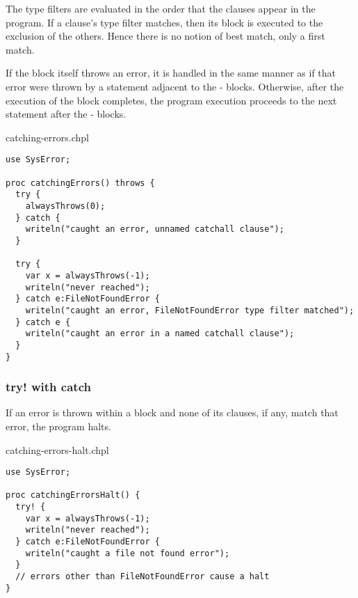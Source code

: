 The type filters are evaluated in the order that the  clauses
appear in the program. If a  clause's type filter matches,
then its block is executed to the exclusion of the others. Hence there
is no notion of best match, only a first match.

If the  block itself throws an error, it is handled in the
same manner as if that error were thrown by a statement adjacent to the
- blocks. Otherwise, after the execution of the
 block completes, the program execution proceeds to the
next statement after the - blocks.

\begin{chapelexample}{catching-errors.chpl}
\begin{chapel}
\begin{verbatim}
use SysError;

proc catchingErrors() throws {
  try {
    alwaysThrows(0);
  } catch {
    writeln("caught an error, unnamed catchall clause");
  }

  try {
    var x = alwaysThrows(-1);
    writeln("never reached");
  } catch e:FileNotFoundError {
    writeln("caught an error, FileNotFoundError type filter matched");
  } catch e {
    writeln("caught an error in a named catchall clause");
  }
}
\end{verbatim}
\end{chapel}
\end{chapelexample}

\subsubsection{try! with catch}
\label{try_bang_with_catch}

If an error is thrown within a  block and none of its
 clauses, if any, match that error, the program halts.

\begin{chapelexample}{catching-errors-halt.chpl}
\begin{chapel}
\begin{verbatim}
use SysError;

proc catchingErrorsHalt() {
  try! {
    var x = alwaysThrows(-1);
    writeln("never reached");
  } catch e:FileNotFoundError {
    writeln("caught a file not found error");
  }
  // errors other than FileNotFoundError cause a halt
}
\end{verbatim}
\end{chapel}
\end{chapelexample}

